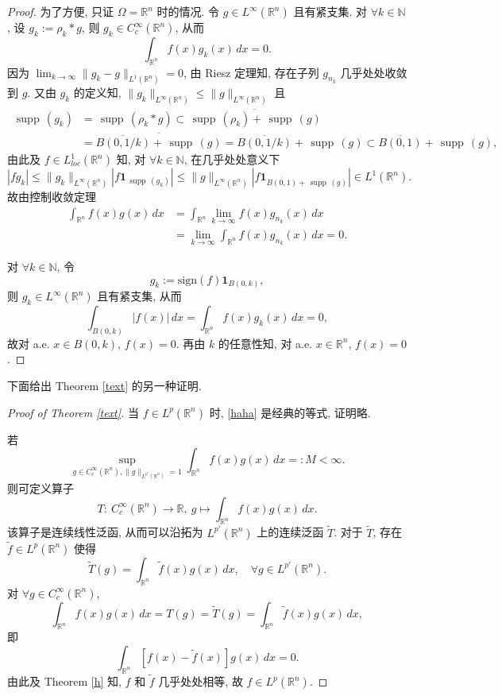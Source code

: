 \documentclass[a4paper,11pt]{article}
\theoremstyle{definition}
\def \supp {\mathop\mathrm{\,supp\,}}
\begin{document}
\begin{proof}
为了方便, 只证 $ \Omega = \mathbb{R}^n $ 时的情况.
令 $ g \in L^\infty(\mathbb{R}^n) $ 且有紧支集.
对 $ \forall k \in \mathbb{N} $, 设 $ g_k := \rho_k * g $, 则 $ g_k \in C_c^\infty(\mathbb{R}^n) $,
从而
$$
\int_{\mathbb{R}^n} f(x) g_k(x) \, dx = 0.
$$
因为 $ \lim_{k \to \infty} \| g_k - g \|_{L^1(\mathbb{R}^n)} = 0 $, 由 Riesz 定理知,
存在子列 $ g_{n_k} $ 几乎处处收敛到 $ g $. 又由 $ g_k $ 的定义知,
$ \|g_k\|_{L^\infty(\mathbb{R}^n)} \leq \|g\|_{L^\infty(\mathbb{R}^n)} $
且
\begin{align*}
\supp(g_k) &= \supp(\rho_k * g)
\subset \overline{\supp(\rho_k) + \supp(g)} \\
&= \overline{\overline{B(0, 1/k)} + \supp(g)}
= \overline{B(0, 1/k)} + \supp(g)
\subset \overline{B(0, 1)} + \supp(g),
\end{align*}
由此及 $ f \in L^1_{loc}(\mathbb{R}^n) $ 知,
对 $ \forall k \in \mathbb{N} $, 在几乎处处意义下
$$
|f g_k| \leq \|g_k\|_{L^\infty(\mathbb{R}^n)} |f \mathbf{1}_{\supp(g_k)}|
\leq \|g\|_{L^\infty(\mathbb{R}^n)} \left|f \mathbf{1}_{\overline{B(0, 1)} + \supp(g)}\right|
\in L^1(\mathbb{R}^n).
$$
故由控制收敛定理
\begin{align*}
\int_{\mathbb{R}^n} f(x) g(x) \, dx
&= \int_{\mathbb{R}^n} \lim_{k \to \infty} f(x) g_{n_k}(x) \, dx \\
&= \lim_{k \to \infty} \int_{\mathbb{R}^n} f(x) g_{n_k}(x) \, dx = 0.
\end{align*}

对 $ \forall k \in \mathbb{N} $, 令
$$
g_k := \mathrm{sign} (f) \mathbf{1}_{B(0, k)},
$$
则 $ g_k \in L^\infty(\mathbb{R}^n) $ 且有紧支集, 从而
$$
\int_{B(0, k)} |f(x)| \, dx
= \int_{\mathbb{R}^n} f(x) g_k(x) \, dx
= 0,
$$
故对 a.e. $ x \in B(0, k) $, $ f(x) = 0 $.
再由 $ k $ 的任意性知, 对 a.e. $ x \in \mathbb{R}^n $, $ f(x) = 0 $.
\end{proof}

下面给出 Theorem \ref{text} 的另一种证明.

\begin{proof}[Proof of Theorem \ref{text}]
当 $ f \in L^p(\mathbb{R}^n) $ 时, \eqref{haha} 是经典的等式, 证明略.

若
$$
\sup_{g \in C_c^\infty(\mathbb{R}^n), \| g \|_{L^{p'}(\mathbb{R}^n)} = 1}
\int_{\mathbb{R}^n} f(x) g(x) \, dx =: M < \infty.
$$
则可定义算子
$$
T :\ C_c^\infty(\mathbb{R}^n) \to \mathbb{R},\ g \mapsto \int_{\mathbb{R}^n} f(x) g(x) \, dx.
$$
该算子是连续线性泛函, 从而可以沿拓为 $ L^{p'}(\mathbb{R}^n) $ 上的连续泛函 $ \widetilde{T} $.
对于 $ \widetilde{T} $, 存在 $ \tilde{f} \in L^p(\mathbb{R}^n) $ 使得
$$
\widetilde{T}(g) = \int_{\mathbb{R}^n} \tilde{f}(x) g(x) \, dx, \quad \forall g \in L^{p'}(\mathbb{R}^n).
$$
对 $ \forall g \in C_c^\infty(\mathbb{R}^n) $,
$$
\int_{\mathbb{R}^n} f(x) g(x) \, dx = T(g) = \widetilde{T}(g) = \int_{\mathbb{R}^n} \tilde{f}(x) g(x) \, dx,
$$
即
$$
\int_{\mathbb{R}^n} \left[f(x) - \tilde{f}(x)\right] g(x) \, dx = 0.
$$
由此及 Theorem \ref{h} 知, $ f $ 和 $ \tilde{f} $ 几乎处处相等, 故 $ f \in L^p(\mathbb{R}^n) $.
\end{proof}
\end{document}
